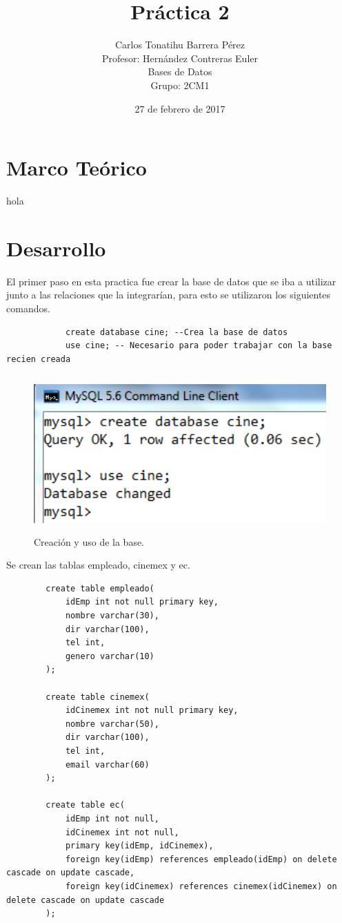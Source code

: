 \documentclass[12pt, titlepage]{article}
\title{Práctica 2}
\author{Carlos Tonatihu Barrera Pérez \\ Profesor: Hernández Contreras Euler \\ Bases de Datos \\ Grupo: 2CM1 }
\date{27 de febrero de 2017}
\begin{document}
    \maketitle
    \tableofcontents
    \section{Marco Teórico}
    hola
    \section{Desarrollo}
        El primer paso en esta practica fue crear la base de datos que se iba a utilizar junto a las relaciones que la integrarían, para esto se utilizaron los siguientes comandos.
        \begin{lstlisting}
            create database cine; --Crea la base de datos
            use cine; -- Necesario para poder trabajar con la base recien creada
        \end{lstlisting}
        \begin{figure}[H]
            \begin{center}
                \includegraphics[width=12cm, height=6cm]{img/hasta-use.png}
                \caption{Creación y uso de la base.}
                \label{fig:hasta-use}
            \end{center}
        \end{figure}
    Se crean las tablas empleado, cinemex y ec.
        \begin{lstlisting}
        create table empleado(
            idEmp int not null primary key,
            nombre varchar(30),
            dir varchar(100),
            tel int,
            genero varchar(10)
        );
        
        create table cinemex(
            idCinemex int not null primary key,
            nombre varchar(50),
            dir varchar(100),
            tel int,
            email varchar(60)
        );
        
        create table ec(
            idEmp int not null,
            idCinemex int not null,
            primary key(idEmp, idCinemex),
            foreign key(idEmp) references empleado(idEmp) on delete cascade on update cascade,
            foreign key(idCinemex) references cinemex(idCinemex) on delete cascade on update cascade
        );
        \end{lstlisting}
\end{document}
